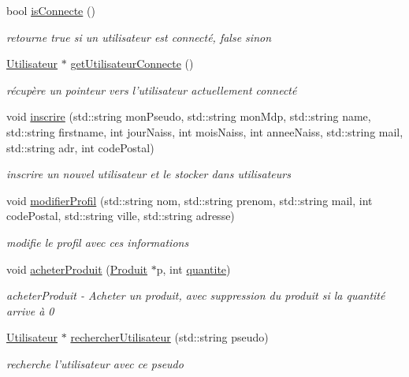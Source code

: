 \begin{DoxyCompactItemize}
bool \hyperlink{class_gestion_bdd_a86ee63900b31ef17bf487ebc1abe8634}{is\-Connecte} ()
\begin{DoxyCompactList}\small\item\em retourne true si un utilisateur est connecté, false sinon \end{DoxyCompactList}\item 
\hyperlink{class_utilisateur}{Utilisateur} $\ast$ \hyperlink{class_gestion_bdd_a2ca66731bc3b85a279d5b140e63ba838}{get\-Utilisateur\-Connecte} ()
\begin{DoxyCompactList}\small\item\em récupère un pointeur vers l'utilisateur actuellement connecté \end{DoxyCompactList}\item 
void \hyperlink{class_gestion_bdd_a02f362c2dd2ca487922e00988f71281b}{inscrire} (std\-::string mon\-Pseudo, std\-::string mon\-Mdp, std\-::string name, std\-::string firstname, int jour\-Naiss, int mois\-Naiss, int annee\-Naiss, std\-::string mail, std\-::string adr, int code\-Postal)
\begin{DoxyCompactList}\small\item\em inscrire un nouvel utilisateur et le stocker dans utilisateurs \end{DoxyCompactList}\item 
void \hyperlink{class_gestion_bdd_a966846d69aa1cf0ed82ef74127e10883}{modifier\-Profil} (std\-::string nom, std\-::string prenom, std\-::string mail, int code\-Postal, std\-::string ville, std\-::string adresse)
\begin{DoxyCompactList}\small\item\em modifie le profil avec ces informations \end{DoxyCompactList}\item 
void \hyperlink{class_gestion_bdd_a039afce368e1b90cbc26334cb8c7d065}{acheter\-Produit} (\hyperlink{class_produit}{Produit} $\ast$p, int \hyperlink{class_gestion_bdd_aea2dfb9c9690c8aef62feb9936426588}{quantite})
\begin{DoxyCompactList}\small\item\em acheter\-Produit -\/ Acheter un produit, avec suppression du produit si la quantité arrive à 0 \end{DoxyCompactList}\item 
\hyperlink{class_utilisateur}{Utilisateur} $\ast$ \hyperlink{class_gestion_bdd_a59989c7d58166c7e4a451b77e56bb852}{rechercher\-Utilisateur} (std\-::string pseudo)
\begin{DoxyCompactList}\small\item\em recherche l'utilisateur avec ce pseudo \end{DoxyCompactList}\item 

\end{DoxyCompactItemize}
